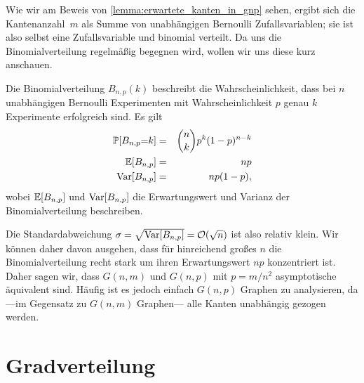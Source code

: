 Wie wir am Beweis von \cref{lemma:erwartete_kanten_in_gnp} sehen, ergibt sich die Kantenanzahl~$m$ als Summe von unabhängigen Bernoulli Zufallsvariablen;
sie ist also selbst eine Zufallsvariable und binomial verteilt.
Da uns die Binomialverteilung regelmäßig begegnen wird, wollen wir uns diese kurz anschauen.
\begin{definition}
    Die  Binomialverteilung $B_{n, p}(k)$ beschreibt die Wahrscheinlichkeit, dass bei $n$ unabhängigen Bernoulli Experimenten mit Wahrscheinlichkeit $p$ genau $k$ Experimente erfolgreich sind.
    Es gilt 
    \begin{eqnarray*}
        \mathbb{P}\!\left[B_{n,p} {=} k\right] &=& \binom{n}{k} p^k (1-p)^{n-k} \\
        \mathbb{E}\!\left[B_{n,p}\right] &=& np \\
        \operatorname{Var}\!\left[B_{n,p}\right] &=& np(1-p),
    \end{eqnarray*}
    wobei $\mathbb{E}\!\left[B_{n,p}\right]$ und $\operatorname{Var}\!\left[B_{n,p}\right]$ die Erwartungswert und Varianz der Binomialverteilung beschreiben.
\end{definition}

Die Standardabweichung $\sigma = \sqrt{\operatorname{Var}\!\left[B_{n,p}\right]} = \mathcal{O}\!\left(\sqrt n\right)$ ist also relativ klein.
Wir können daher davon ausgehen, dass für hinreichend großes $n$ die Binomialverteilung recht stark um ihren Erwartungswert $np$ konzentriert ist.
Daher sagen wir, dass $G(n, m)$ und $G(n, p)$ mit $p=m/n^2$ asymptotische äquivalent sind.
Häufig ist es jedoch einfach $G(n,p)$ Graphen zu analysieren, da ---im Gegensatz zu $G(n,m)$ Graphen--- alle Kanten unabhängig gezogen werden.

\section{Gradverteilung}


